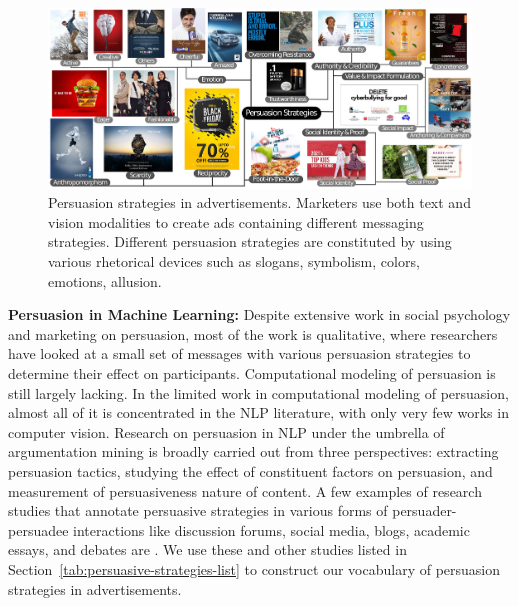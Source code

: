 \begin{landscape}
    
\begin{figure}[t]
        \centering
        \includegraphics[width=1.5\textwidth]{images/flowchart.pdf}
        \caption{\small {} Persuasion strategies in advertisements. Marketers use both text and vision modalities to create ads containing different messaging strategies. Different persuasion strategies are constituted by using various rhetorical devices such as slogans, symbolism, colors, emotions, allusion.}
        \label{fig:persuasion-strategies-headline-image}
\end{figure}
\end{landscape}





\textbf{Persuasion in Machine Learning:} Despite extensive work in social psychology and marketing on persuasion, most of the work is qualitative, where researchers have looked at a small set of messages with various persuasion strategies to determine their effect on participants. Computational modeling of persuasion is still largely lacking. In the limited work in computational modeling of persuasion, almost all of it is concentrated in the NLP literature, with only very few works in computer vision.
Research on persuasion in NLP under the umbrella of argumentation mining is broadly carried out from three perspectives: extracting persuasion tactics, studying the effect of constituent factors on persuasion, and measurement of persuasiveness nature of content. A few examples of research studies that annotate persuasive strategies in various forms of persuader-persuadee interactions like discussion forums, social media, blogs, academic essays, and debates are \cite{anand2011believe,tan2016winning,chen2021weakly}. We use these and other studies listed in Section~\ref{tab:persuasive-strategies-list} to construct our vocabulary of persuasion strategies in advertisements. 

